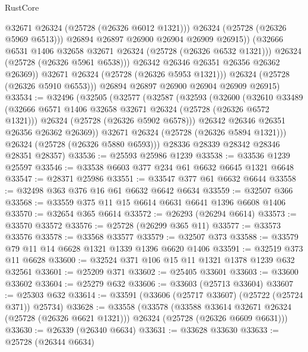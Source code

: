 \begin{lexlean}{RustCore}
\begin{coremodule}
                        @32671
                        @26324
                        (@25728 (@26326 @6012 @1321)))
                      @26324
                      (@25728 (@26326 @5969 @6513)))
                    @26894
                    @26897
                    @26900
                    @26904
                    @26909
                    @26915))
                (@32666 @6531 @1406 @32658 @32671 @26324 (@25728 (@26326 @6532 @1321)))
                @26324
                (@25728 (@26326 @5961 @6538)))
              @26342
              @26346
              @26351
              @26356
              @26362
              @26369))
          @32671
          @26324
          (@25728 (@26326 @5953 @1321)))
        @26324
        (@25728 (@26326 @5910 @6553)))
      @26894
      @26897
      @26900
      @26904
      @26909
      @26915)
@33534 := @32496
    (@32505
      (@32577
        (@32587
          (@32593
            (@32600
              (@32610
                @33489
                (@32666 @6571 @1406 @32658 @32671 @26324 (@25728 (@26326 @6572 @1321)))
                @26324
                (@25728 (@26326 @5902 @6578)))
              @26342
              @26346
              @26351
              @26356
              @26362
              @26369))
          @32671
          @26324
          (@25728 (@26326 @5894 @1321)))
        @26324
        (@25728 (@26326 @5880 @6593)))
      @28336
      @28339
      @28342
      @28346
      @28351
      @28357)
@33536 := @25593 @25986 @1239
@33538 := @33536 @1239 @25597
@33546 := @33538 @6603 @377 @234 @61 @6632 @6645 @1321 @6648
@33547 := @28371 @25986
@33551 := @33547 @377 @61 @6632 @6644
@33558 := @32498 @363 @376 @16 @61 @6632 @6642 @6634
@33559 := @32507 @366
@33568 := @33559 @375 @11 @15 @6614 @6631 @6641 @1396 @6608 @1406
@33570 := @32654 @365 @6614
@33572 := @26293 (@26294 @6614)
@33573 := @33570 @33572
@33576 := @25728 (@26299 @365 @11)
@33577 := @33573 @33576
@33578 := @33568 @33577
@33579 := @32507 @373
@33588 := @33579 @79 @11 @14 @6628 @1321 @1339 @1396 @6620 @1406
@33591 := @32519 @373 @11 @6628
@33600 := @32524 @371 @106 @15 @11 @1321 @1378 @1239 @632 @32561
@33601 := @25209 @371
@33602 := @25405 @33601
@33603 := @33600 @33602
@33604 := @25279 @632
@33606 := @33603 (@25713 @33604)
@33607 := @25303 @632
@33614 := @33591 (@33606 (@25717 @33607) (@25722 (@25724 @371)) @25734)
@33628 := @33558
    (@33578
      (@33588 @33614 @32671 @26324 (@25728 (@26326 @6621 @1321)))
      @26324
      (@25728 (@26326 @6609 @6631)))
@33630 := @26339 (@26340 @6634)
@33631 := @33628 @33630
@33633 := @25728 (@26344 @6634)

\end{coremodule}
\end{lexlean}

